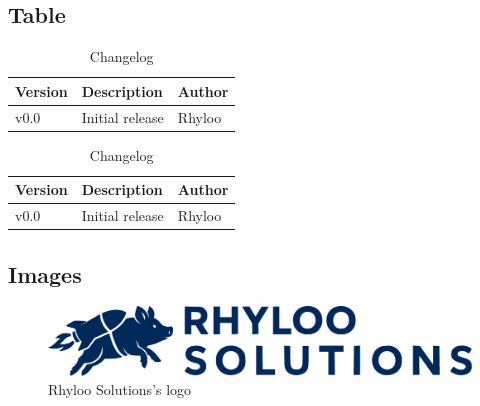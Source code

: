 \documentclass[english]{reporti}
\begin{document}
\subsection{Table}
\label{sec:orgdd3da27}
\begin{table}[H]
\caption{Changelog}
\centering
\begin{tabular}{lll}
\hline
Version & Description & Author\\[0pt]
\hline
v0.0 & Initial release & Rhyloo\\[0pt]
\hline
\end{tabular}
\end{table}
\begin{table}[H]
\caption{Changelog}
\centering
\begin{tabular}{lll}
\hline
Version & Description & Author\\[0pt]
\hline
v0.0 & Initial release & Rhyloo\\[0pt]
\hline
\end{tabular}
\end{table}


\subsection{Images}
\label{sec:org3081b00}
\begin{figure}[htbp]
\centering
\includegraphics[fbox,width=.9\linewidth]{./figures/logo/rhyloo_solutions_horizontal.pdf}
\caption{Rhyloo Solutions's logo}
\end{figure}
\end{document}
